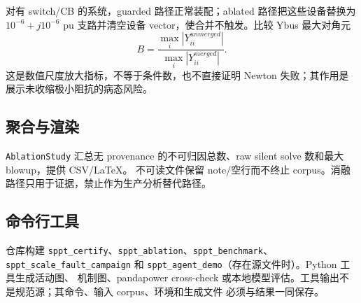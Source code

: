 对有 switch/CB 的系统，guarded 路径正常装配；ablated 路径把这些设备替换为
$10^{-6}+j10^{-6}$ pu 支路并清空设备 vector，使合并不触发。比较 Ybus 最大对角元
\begin{equation}
B=\frac{\max_i|Y_{ii}^{unmerged}|}{\max_i|Y_{ii}^{merged}|}.
\end{equation}
这是数值尺度放大指标，不等于条件数，也不直接证明 Newton 失败；其作用是展示未收缩极小阻抗的病态风险。

\subsection{聚合与渲染}

\texttt{AblationStudy} 汇总无 provenance 的不可归因总数、raw silent solve 数和最大 blowup，提供 CSV/LaTeX。
不可读文件保留 note/空行而不终止 corpus。消融路径只用于证据，禁止作为生产分析替代路径。

\subsection{命令行工具}

仓库构建 \texttt{sppt\_certify}、\texttt{sppt\_ablation}、\texttt{sppt\_benchmark}、
\texttt{sppt\_scale\_fault\_campaign} 和 \texttt{sppt\_agent\_demo}（存在源文件时）。Python 工具生成活动图、
机制图、pandapower cross-check 或本地模型评估。工具输出不是规范源；其命令、输入 corpus、环境和生成文件
必须与结果一同保存。


